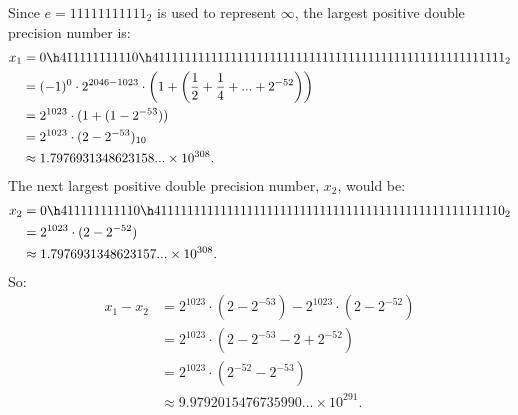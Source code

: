 \documentclass[11pt,twoside,openany]{memoir}
\begin{document}
        \begin{solution}
            Since $e = 11111111111_2$ is used to represent $\infty$, the largest positive double precision number is:
                \begin{equation*}
                \begin{split}
                    x_1 &= 0\h4 11111111110 \h4 1111111111111111111111111111111111111111 1111111111111_2 \\
                    & = (-1)^0 \cdot 2^{2046-1023} \cdot \left( 1 + \left(\frac{1}{2} + \frac{1}{4} + ... + 2^{-52}\right) \right) \\
                    & =  2^{1023} \cdot(1 + (1 - 2^{-53}))\\
                    & = 2^{1023} \cdot (2 - 2^{-53})_{10} \\
                    & \approx 1.7976931348623158... \times 10^{308}.
                \end{split}
                \end{equation*}
            The next largest positive double precision number, $x_2$, would be:
                \begin{equation*}
                \begin{split}
                    x_2 &= 0\h4 11111111110 \h4 1111111111111111111111111111111111111111111111111110_2 \\
                    & = 2^{1023} \cdot (2  - 2^{-52}) \\
                    & \approx 1.7976931348623157... \times 10^{308}.
                \end{split}
                \end{equation*}
            So:
                \begin{equation*}
                \begin{split}
                    x_1 - x_2 
                    & = 2^{1023} \cdot (2 - 2^{-53}) - 2^{1023} \cdot (2  - 2^{-52}) \\
                    & = 2^{1023} \cdot (2 - 2^{-53} - 2 + 2^{-52}) \\
                    & = 2^{1023} \cdot (2^{-52} - 2^{-53}) \\
                    & \approx 9.9792015476735990... \times 10^{291}.
                \end{split}
                \end{equation*}
        \end{solution}
\end{document}
